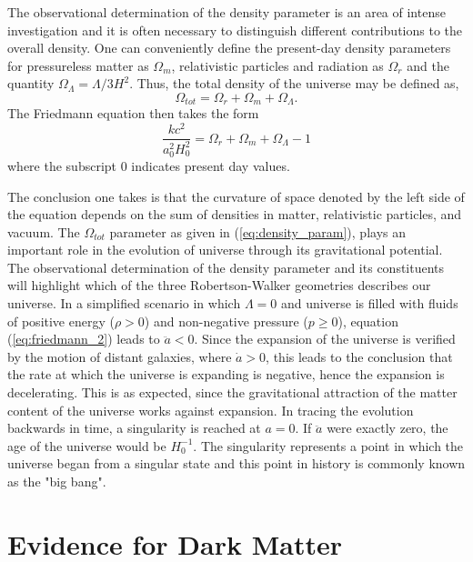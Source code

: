 The observational determination of the density parameter is an area of intense investigation and it is often necessary to distinguish different contributions to the overall density. One can conveniently define the present-day density parameters for pressureless matter as $\Omega_{m}$, relativistic particles and radiation as $\Omega_r$ and the quantity $\Omega_{\Lambda} = \Lambda/3H^2$. Thus, the total density of the universe may be defined as, 
%
\begin{equation}
  \Omega_{tot} = \Omega_{r} + \Omega_{m} + \Omega_{\Lambda}. 
\end{equation}
%
The Friedmann equation then takes the form
%
\begin{equation}
  \frac{kc^2}{a_{0}^2H_{0}^2} = \Omega_{r} + \Omega_{m} + \Omega_{\Lambda} - 1
\end{equation}
%
where the subscript 0 indicates present day values. 

The conclusion one takes is that the curvature of space denoted by the left side of the equation depends on the sum of densities in matter, relativistic particles, and vacuum.  The $\Omega_{tot}$ parameter as given in (\ref{eq:density_param}), plays an important role in the evolution of universe through its gravitational potential. The observational determination of the density parameter and its constituents will highlight which of the three Robertson-Walker geometries describes our universe. In a simplified scenario in which $\Lambda = 0$ and universe is filled with fluids of positive energy ($\rho > 0$) and non-negative pressure ($p \geq 0$), equation (\ref{eq:friedmann_2}) leads to $\ddot{a} < 0$. Since the expansion of the universe is verified by the motion of distant galaxies, where $\dot{a} > 0$, this leads to the conclusion that the rate at which the universe is expanding is negative, hence the expansion is decelerating. This is as expected, since the gravitational attraction of the matter content of the universe works against expansion. In tracing the evolution backwards in time, a singularity is reached at $a = 0$. If $\ddot{a}$ were exactly zero, the age of the universe would be $H_{0}^{-1}$. The singularity represents a point in which the universe began from a singular state and this point in history is commonly known as the "big bang".  


\section{Evidence for Dark Matter}
\label{sec:darkmatter}

